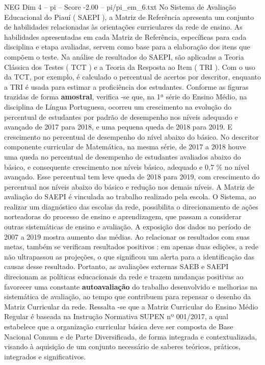 \begin{textsample}{NEG Dim 4 – pi – Score -2.00 – pi/pi\_em\_6.txt}  \label{ex:f4_neg_163}
No Sistema de Avaliação Educacional do Piauí ( SAEPI ), a Matriz de Referência apresenta um conjunto de habilidades relacionadas às orientações curriculares da rede de ensino.
As habilidades apresentadas em cada Matriz de Referência, específicas para cada disciplina e etapa avaliadas, servem como base para a elaboração dos itens que compõem o teste.
Na análise de resultados do SAEPI, são aplicadas a Teoria Clássica dos Testes ( TCT ) e a Teoria da Resposta ao Item ( TRI ).
Com o uso da TCT, por exemplo, é calculado o percentual de acertos por descritor, enquanto a TRI é usada para estimar a proficiência dos estudantes.
Conforme as figuras trazidas de forma \textbf{amostral}, verifica -se que, na 1ª série do Ensino Médio, na disciplina de Língua Portuguesa, ocorreu um crescimento na evolução do percentual de estudantes por padrão de desempenho nos níveis adequado e avançado de 2017 para 2018, e uma pequena queda de 2018 para 2019.
E crescimento no percentual de desempenho do nível abaixo do básico.
No descritor componente curricular de Matemática, na mesma série, de 2017 a 2018 houve uma queda no percentual de desempenho de estudantes avaliados abaixo do básico, e consequente crescimento nos níveis básico, adequado e 0,7 \% no nível avançado.
Esse percentual tem leve queda de 2018 para 2019, com crescimento do percentual nos níveis abaixo do básico e redução nos demais níveis.
A Matriz de avaliação do SAEPI é vinculada ao trabalho realizado pela escola.
O Sistema, ao realizar um diagnóstico das escolas da rede, possibilita o direcionamento de ações norteadoras do processo de ensino e aprendizagem, que passam a considerar outras sistemáticas de ensino e avaliação.
A exposição dos dados no período de 2007 a 2019 mostra aumento das médias.
Ao relacionar os resultados com suas metas, também se verificam resultados positivos : em apenas duas edições, a rede não ultrapassou as projeções, o que significou um alerta para a identificação das causas desse resultado.
Portanto, as avaliações externas SAEB e SAEPI direcionam as políticas educacionais da rede e trazem mudanças positivas ao favorecer uma constante \textbf{autoavaliação} do trabalho desenvolvido e melhorias na sistemática de avaliação, ao tempo que contribuem para repensar o desenho da Matriz Curricular da rede.
Ressalta -se que a Matriz Curricular do Ensino Médio Regular é baseada na Instrução Normativa SUPEN nº 001/2017, a qual estabelece que a organização curricular básica deve ser composta de Base Nacional Comum e de Parte Diversificada, de forma integrada e contextualizada, visando à aquisição de um conjunto necessário de saberes teóricos, práticos, integrados e significativos.

\end{textsample}
